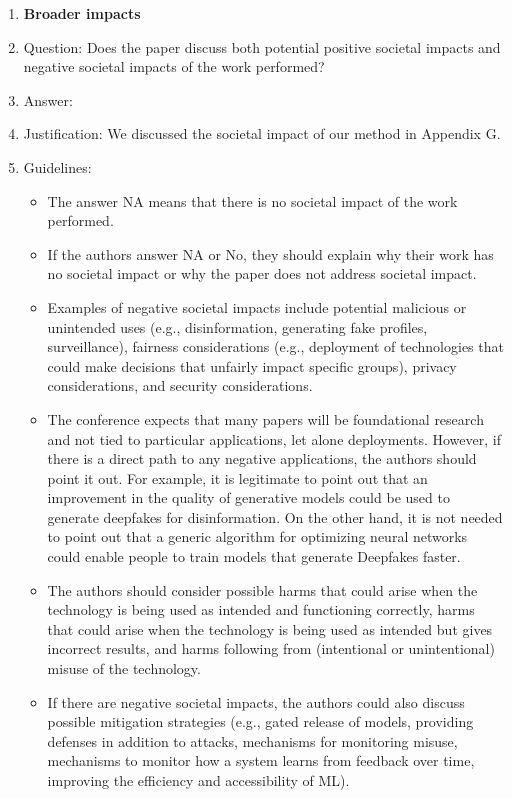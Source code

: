 \documentclass{article}
\begin{document}
\begin{enumerate}
\item {\bf Broader impacts}
    \item[] Question: Does the paper discuss both potential positive societal impacts and negative societal impacts of the work performed?
    \item[] Answer: \answerYes{} %
    \item[] Justification: We discussed the societal impact of our method in Appendix G.
    \item[] Guidelines:
    \begin{itemize}
        \item The answer NA means that there is no societal impact of the work performed.
        \item If the authors answer NA or No, they should explain why their work has no societal impact or why the paper does not address societal impact.
        \item Examples of negative societal impacts include potential malicious or unintended uses (e.g., disinformation, generating fake profiles, surveillance), fairness considerations (e.g., deployment of technologies that could make decisions that unfairly impact specific groups), privacy considerations, and security considerations.
        \item The conference expects that many papers will be foundational research and not tied to particular applications, let alone deployments. However, if there is a direct path to any negative applications, the authors should point it out. For example, it is legitimate to point out that an improvement in the quality of generative models could be used to generate deepfakes for disinformation. On the other hand, it is not needed to point out that a generic algorithm for optimizing neural networks could enable people to train models that generate Deepfakes faster.
        \item The authors should consider possible harms that could arise when the technology is being used as intended and functioning correctly, harms that could arise when the technology is being used as intended but gives incorrect results, and harms following from (intentional or unintentional) misuse of the technology.
        \item If there are negative societal impacts, the authors could also discuss possible mitigation strategies (e.g., gated release of models, providing defenses in addition to attacks, mechanisms for monitoring misuse, mechanisms to monitor how a system learns from feedback over time, improving the efficiency and accessibility of ML).
    \end{itemize}
    

\end{enumerate}
\end{document}
